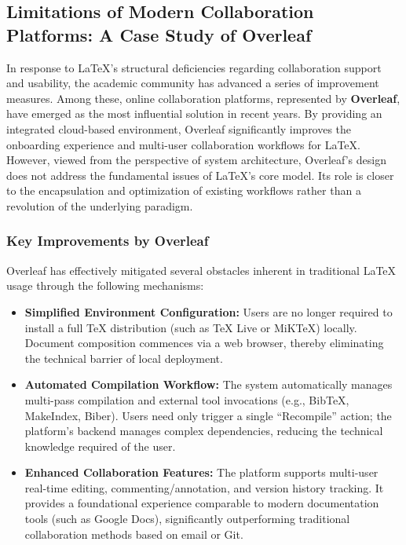 \subsection{Limitations of Modern Collaboration Platforms: A Case Study of Overleaf}

In response to \LaTeX{}'s structural deficiencies regarding collaboration support and usability, the academic community has advanced a series of improvement measures. Among these, online collaboration platforms, represented by \textbf{Overleaf}, have emerged as the most influential solution in recent years. By providing an integrated cloud-based environment, Overleaf significantly improves the onboarding experience and multi-user collaboration workflows for \LaTeX{}. However, viewed from the perspective of system architecture, Overleaf's design does not address the fundamental issues of \LaTeX{}'s core model. Its role is closer to the encapsulation and optimization of existing workflows rather than a revolution of the underlying paradigm.

\subsubsection{Key Improvements by Overleaf}

Overleaf has effectively mitigated several obstacles inherent in traditional \LaTeX{} usage through the following mechanisms:

\begin{itemize}
    \item \textbf{Simplified Environment Configuration:} Users are no longer required to install a full \TeX{} distribution (such as TeX Live or MiKTeX) locally. Document composition commences via a web browser, thereby eliminating the technical barrier of local deployment.

    \item \textbf{Automated Compilation Workflow:} The system automatically manages multi-pass compilation and external tool invocations (e.g., BibTeX, MakeIndex, Biber). Users need only trigger a single ``Recompile'' action; the platform's backend manages complex dependencies, reducing the technical knowledge required of the user.

    \item \textbf{Enhanced Collaboration Features:} The platform supports multi-user real-time editing, commenting/annotation, and version history tracking. It provides a foundational experience comparable to modern documentation tools (such as Google Docs), significantly outperforming traditional collaboration methods based on email or Git.
\end{itemize}

